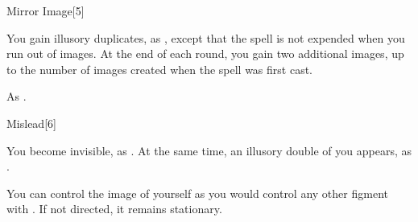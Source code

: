 \begin{spellsection}[Greater]{Mirror Image}[5]
    \begin{spellheader}
    \end{spellheader}
    \begin{spellcontent}
        \begin{spelltargetinginfo}
        \end{spelltargetinginfo}
        \begin{spelleffects}
            \spelleffect You gain illusory duplicates, as , except that the spell is not expended when you run out of images. At the end of each round, you gain two additional images, up to the number of images created when the spell was first cast.
            \spelldur \durshort \dismissable
        \end{spelleffects}
    \end{spellcontent}
    \begin{spellfooter}
        \spellnotes As .
        \miscastexplode
    \end{spellfooter}
\end{spellsection}

\begin{spellsection}{Mislead}[6]
    \begin{spellheader}
    \end{spellheader}
    \begin{spellcontent}
        \begin{spelltargetinginfo}
        \end{spelltargetinginfo}
        \begin{spelleffects}
            \spelleffect You become invisible, as . At the same time, an illusory double of you appears, as .

            You can control the image of yourself as you would control any other figment with . If not directed, it remains stationary.
            \spelldur \durshort \dismissable
        \end{spelleffects}
    \end{spellcontent}
    \begin{spellfooter}
        \miscastexplode
    \end{spellfooter}
\end{spellsection}

